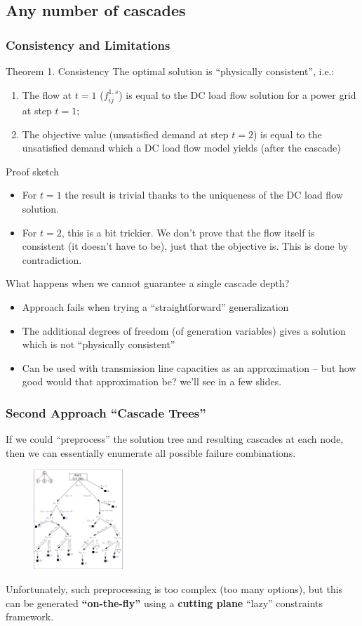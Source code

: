 \documentclass{beamer}
\begin{document}
\subsection{Any number of cascades}
\begin{frame}
\frametitle{Consistency and Limitations}
\begin{block}{Theorem 1. Consistency}
The optimal solution is ``physically consistent'', i.e.:
\begin{enumerate}
\item The flow at $t=1$ ($f_{ij}^{1,s}$) is equal to the DC load flow solution for a power grid at step $t=1$;
\item The objective value (unsatisfied demand at step $t=2$) is equal to the unsatisfied demand which a DC load flow model yields (after the cascade)
\end{enumerate}
\end{block}\pause\tiny
Proof sketch
\begin{itemize}
	\item For $t=1$ the result is trivial thanks to the uniqueness of the DC load flow solution.
	\item For $t=2$, this is a bit trickier. We don't prove that the flow itself is consistent (it doesn't have to be), just that the objective is. This is done by contradiction.
\end{itemize}\pause
What happens when we cannot guarantee a single cascade depth? 
\begin{itemize}
	\item Approach fails when trying a ``straightforward'' generalization
	\item The additional degrees of freedom (of generation variables) gives a solution which is not ``physically consistent''
	\item Can be used with transmission line capacities as an approximation -- but how good would that approximation be? we'll see in a few slides.
\end{itemize}
\end{frame}

\begin{frame}
\frametitle{Second Approach ``Cascade Trees''}
If we could ``preprocess'' the solution tree and resulting cascades at each node, then we can essentially enumerate all possible failure combinations.
\begin{figure}[h]
	\centering
		\includegraphics[width=0.30\textwidth]{Aux_files/figure_4_three-step-cascade-tree.png}
	\label{fig:figure_4_three-step-cascade-tree}
\end{figure}
Unfortunately, such preprocessing is too complex (too many options), but this can be generated \textbf{``on-the-fly''} using a \textbf{cutting plane} ``lazy'' constraints framework.
\end{frame}
\end{document}
